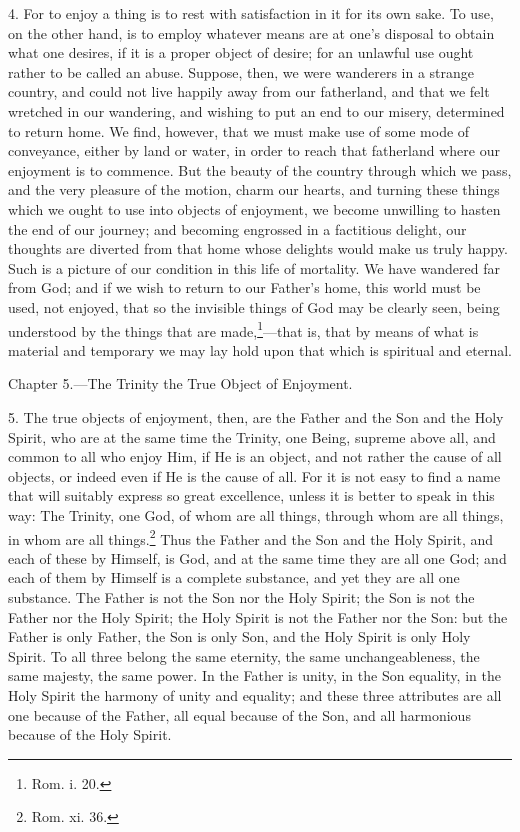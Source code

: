 4. For to enjoy a thing is to rest with satisfaction in it for its own sake. To use, on the other hand, is to employ whatever means are at one’s disposal to obtain what one desires, if it is a proper object of desire; for an unlawful use ought rather to be called an abuse. Suppose, then, we were wanderers in a strange country, and could not live happily away from our fatherland, and that we felt wretched in our wandering, and wishing to put an end to our misery, determined to return home. We find, however, that we must make use of some mode of conveyance, either by land or water, in order to reach that fatherland where our enjoyment is to commence. But the beauty of the country through which we pass, and the very pleasure of the motion, charm our hearts, and turning these things which we ought to use into objects of enjoyment, we become unwilling to hasten the end of our journey; and becoming engrossed in a factitious delight, our thoughts are diverted from that home whose delights would make us truly happy. Such is a picture of our condition in this life of mortality. We have wandered far from God; and if we wish to return to our Father’s home, this world must be used, not enjoyed, that so the invisible things of God may be clearly seen, being understood by the things that are made,\footnote{Rom. i. 20.}—that is, that by means of what is material and temporary we may lay hold upon that which is spiritual and eternal.


Chapter 5.—The Trinity the True Object of Enjoyment.

5. The true objects of enjoyment, then, are the Father and the Son and the Holy Spirit, who are at the same time the Trinity, one Being, supreme above all, and common to all who enjoy Him, if He is an object, and not rather the cause of all objects, or indeed even if He is the cause of all. For it is not easy to find a name that will suitably express so great excellence, unless it is better to speak in this way: The Trinity, one God, of whom are all things, through whom are all things, in whom are all things.\footnote{Rom. xi. 36.} Thus the Father and the Son and the Holy Spirit, and each of these by Himself, is God, and at the same time they are all one God; and each of them by Himself is a complete substance, and yet they are all one substance. The Father is not the Son nor the Holy Spirit; the Son is not the Father nor the Holy Spirit; the Holy Spirit is not the Father nor the Son: but the Father is only Father, the Son is only Son, and the Holy Spirit is only Holy Spirit. To all three belong the same eternity, the same unchangeableness, the same majesty, the same power. In the Father is unity, in the Son equality, in the Holy Spirit the harmony of unity and equality; and these three attributes are all one because of the Father, all equal because of the Son, and all harmonious because of the Holy Spirit.


